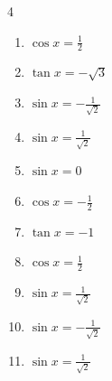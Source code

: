 \begin{multicols}{4}
\begin{enumerate}

  \item $\displaystyle \cos{x}  = \frac{1}{2}$


  \item $\displaystyle \tan{x}  = -\sqrt{3}$


  \item $\displaystyle \sin{x}  = -\frac{1}{\sqrt{2}}$


  \item $\displaystyle \sin{x}  = \frac{1}{\sqrt{2}}$


  \item $\displaystyle \sin{x}  = 0$


  \item $\displaystyle \cos{x}  = -\frac{1}{2}$


  \item $\displaystyle \tan{x}  = -1$


  \item $\displaystyle \cos{x}  = \frac{1}{2}$


\columnbreak %

\resetques

  \item $\displaystyle \sin{x}  = \frac{1}{\sqrt{2}}$


  \item $\displaystyle \sin{x}  = -\frac{1}{\sqrt{2}}$


  \item $\displaystyle \sin{x}  = \frac{1}{\sqrt{2}}$


\end{enumerate}
\end{multicols}
